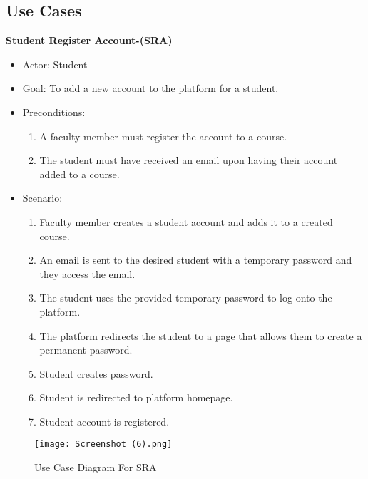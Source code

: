 \documentclass[letterpaper,12pt,oneside,listof=totoc]{scrreprt}
\begin{document}
\subsection{Use Cases}
\hfill \break
\textbf{Student Register Account-(SRA)}
\begin{itemize}
    \item Actor: Student
    \item Goal: To add a new account to the platform for a student. 
    \item Preconditions:
    \begin{enumerate}
        \item A faculty member must register the account to a course.
        \item The student must have received an email upon having their account added to a course.
    \end{enumerate}
    \item Scenario:
    \begin{enumerate}
        \item Faculty member creates a student account and adds it to a created course.
        \item An email is sent to the desired student with a temporary password and they access the email.
        \item The student uses the provided temporary password to log onto the platform.
        \item The platform redirects the student to a page that allows them to create a permanent password.
        \item Student creates password.
        \item Student is redirected to platform homepage.
        \item Student account is registered.
    \end{enumerate}
\end{itemize}

\clearpage

\begin{figure}[htbp]
    \centering
    \texttt{[image: Screenshot (6).png]}
    \caption{Use Case Diagram For SRA}
    \label{fig:SRA}
\end{figure}

\clearpage
\end{document}
